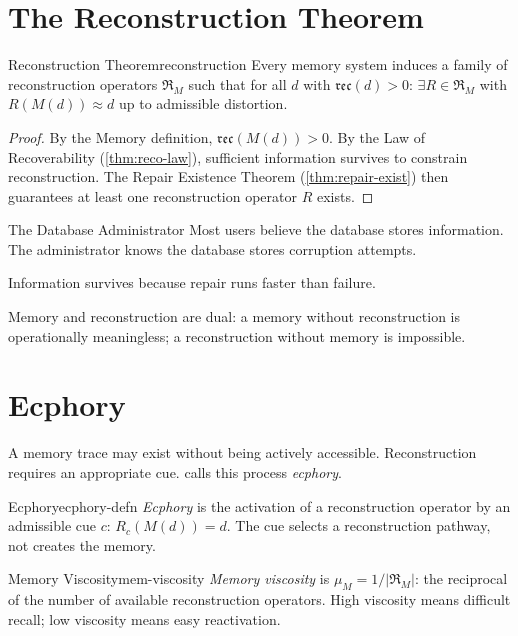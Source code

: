 \documentclass[12pt,twoside,openright]{book}
\newcommand{\reco}{\mathfrak{rec}}
\begin{document}
\section{The Reconstruction Theorem}
\label{sec:ch6-reconstruction}

\begin{theorem}{Reconstruction Theorem}{reconstruction}
  Every memory system induces a family of reconstruction
  operators $\mathfrak{R}_M$ such that for all $d$ with
  $\reco(d) > 0$: $\exists R \in \mathfrak{R}_M$ with
  $R(M(d)) \approx d$ up to admissible distortion.
\end{theorem}

\begin{proof}
  By the Memory definition, $\reco(M(d)) > 0$.
  By the Law of Recoverability (\cref{thm:reco-law}),
  sufficient information survives to constrain
  reconstruction. The Repair Existence Theorem
  (\cref{thm:repair-exist}) then guarantees at least
  one reconstruction operator $R$ exists.
\end{proof}

\begin{repairaside}{The Database Administrator}
Most users believe the database stores information. The
administrator knows the database stores corruption attempts.

Information survives because repair runs faster than
failure.
\end{repairaside}

Memory and reconstruction are dual: a memory without
reconstruction is operationally meaningless; a reconstruction
without memory is impossible.

\section{Ecphory}
\label{sec:ch6-ecphory}

A memory trace may exist without being actively accessible.
Reconstruction requires an appropriate cue.
\textcite{tulving1983} calls this process \emph{ecphory}.

\begin{definition}{Ecphory}{ecphory-defn}
  \emph{Ecphory} is the activation of a reconstruction
  operator by an admissible cue $c$:
  $R_c(M(d)) = d$.
  The cue selects a reconstruction pathway, not creates
  the memory. 
\end{definition}

\begin{definition}{Memory Viscosity}{mem-viscosity}
  \emph{Memory viscosity} is $\mu_M = 1/|\mathfrak{R}_M|$:
  the reciprocal of the number of available reconstruction
  operators. High viscosity means difficult recall; low
  viscosity means easy reactivation.
\end{definition}
\end{document}
